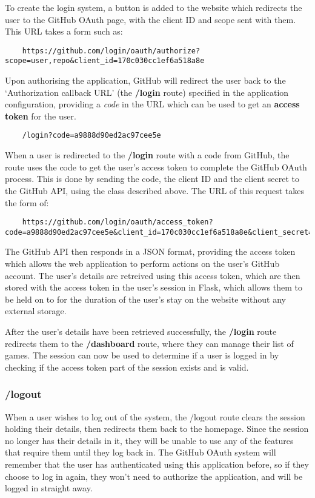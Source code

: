 	To create the login system, a button is added to the website which redirects the user to the GitHub OAuth page, with the client ID and scope sent with them. This URL takes a form such as:

	\begin{lstlisting}
	https://github.com/login/oauth/authorize?scope=user,repo&client_id=170c030cc1ef6a518a8e
	\end{lstlisting}

	Upon authorising the application, GitHub will redirect the user back to the `Authorization callback URL' (the \textbf{/login} route) specified in the application configuration, providing a \emph{code} in the URL which can be used to get an \textbf{access token} for the user.

	\begin{lstlisting}
	/login?code=a9888d90ed2ac97cee5e
	\end{lstlisting}

	When a user is redirected to the \textbf{/login} route with a code from GitHub, the route uses the code to get the user's access token to complete the GitHub OAuth process. This is done by sending the code, the client ID and the client secret to the GitHub API, using the class described above. The URL of this request takes the form of:

	\begin{lstlisting}
	https://github.com/login/oauth/access_token?code=a9888d90ed2ac97cee5e&client_id=170c030cc1ef6a518a8e&client_secret=3oeqft9w9zd536m0oxar
	\end{lstlisting}

	The GitHub API then responds in a JSON format, providing the access token which allows the web application to perform actions on the user's GitHub account. The user's details are retreived using this access token, which are then stored with the access token in the user's session in Flask, which allows them to be held on to for the duration of the user's stay on the website without any external storage. 

	After the user's details have been retrieved successfully, the \textbf{/login} route redirects them to the \textbf{/dashboard} route, where they can manage their list of games. The session can now be used to determine if a user is logged in by checking if the access token part of the session exists and is valid.

	\subsubsection{/logout}
	When a user wishes to log out of the system, the /logout route clears the session holding their details, then redirects them back to the homepage. Since the session no longer has their details in it, they will be unable to use any of the features that require them until they log back in. The GitHub OAuth system will remember that the user has authenticated using this application before, so if they choose to log in again, they won't need to authorize the application, and will be logged in straight away.

